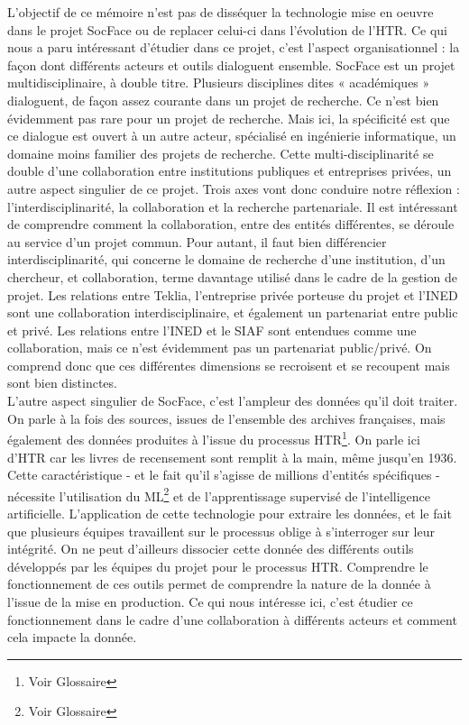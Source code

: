 \documentclass[a4paper,12pt,twoside]{book}
\begin{document}
L’objectif de ce mémoire n’est pas de disséquer la technologie mise en oeuvre dans le projet SocFace ou de replacer celui-ci dans l’évolution de l'\gls{HTR}. Ce qui nous a paru intéressant d’étudier dans ce projet, c’est l’aspect organisationnel : la façon dont différents acteurs et outils dialoguent ensemble. SocFace est un projet multidisciplinaire, à double titre. Plusieurs disciplines dites « académiques » dialoguent, de façon assez courante dans un projet de recherche. Ce n’est bien évidemment pas rare pour un projet de recherche. Mais ici, la spécificité est que ce dialogue est ouvert à un autre acteur, spécialisé en ingénierie informatique, un domaine moins familier des projets de recherche. Cette multi-disciplinarité se double d’une collaboration entre institutions publiques et entreprises privées, un autre aspect singulier de ce projet. Trois axes vont donc conduire notre réflexion : l’interdisciplinarité, la collaboration et la recherche partenariale. Il est intéressant de comprendre comment la collaboration, entre des entités différentes, se déroule au service d’un projet commun. Pour autant, il faut bien différencier interdisciplinarité, qui concerne le domaine de recherche d’une institution, d’un chercheur, et collaboration, terme davantage utilisé dans le cadre de la gestion de projet. Les relations entre Teklia, l’entreprise privée porteuse du projet et l’INED sont une collaboration interdisciplinaire, et également un partenariat entre public et privé. Les relations entre l’INED et le SIAF sont entendues comme une collaboration, mais ce n’est évidemment pas un partenariat public/privé. On comprend donc que ces différentes dimensions se recroisent et se recoupent mais sont bien distinctes. \\
L’autre aspect singulier de SocFace, c’est l’ampleur des données qu’il doit traiter. On parle à la fois des sources, issues de l’ensemble des archives françaises, mais également des données produites à l’issue du processus \gls{HTR}\footnote{Voir Glossaire}. On parle ici d’\gls{HTR} car les livres de recensement sont remplit à la main, même jusqu’en 1936. Cette caractéristique - et le fait qu’il s'agisse de millions d’entités spécifiques -  nécessite l’utilisation du \gls{ML}\footnote{Voir Glossaire} et de l'apprentissage supervisé de l'intelligence artificielle. L’application de cette technologie pour extraire les données, et le fait que plusieurs équipes travaillent sur le processus oblige à s’interroger sur leur intégrité. On ne peut d’ailleurs dissocier cette donnée des différents outils développés par les équipes du projet pour le processus \gls{HTR}. Comprendre le fonctionnement de ces outils permet de comprendre la nature de la donnée à l’issue de la mise en production. Ce qui nous intéresse ici, c’est étudier ce fonctionnement dans le cadre d’une collaboration à différents acteurs et comment cela impacte la donnée. \\
\end{document}
